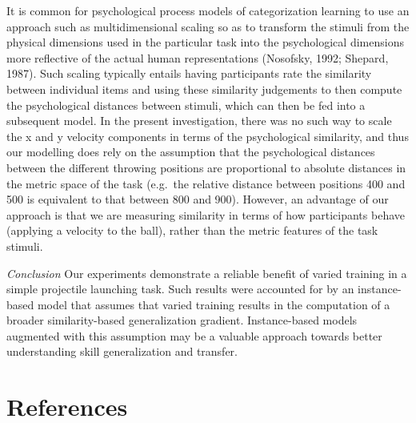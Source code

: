 \documentclass[
  man,floatsintext]{apa7}
\begin{document}
It is common for psychological process models of categorization learning to use an approach such as multidimensional scaling so as to transform the stimuli from the physical dimensions used in the particular task into the psychological dimensions more reflective of the actual human representations (Nosofsky, 1992; Shepard, 1987). Such scaling typically entails having participants rate the similarity between individual items and using these similarity judgements to then compute the psychological distances between stimuli, which can then be fed into a subsequent model. In the present investigation, there was no such way to scale the x and y velocity components in terms of the psychological similarity, and thus our modelling does rely on the assumption that the psychological distances between the different throwing positions are proportional to absolute distances in the metric space of the task (e.g.~the relative distance between positions 400 and 500 is equivalent to that between 800 and 900). However, an advantage of our approach is that we are measuring similarity in terms of how participants behave (applying a velocity to the ball), rather than the metric features of the task stimuli.

\emph{Conclusion}
Our experiments demonstrate a reliable benefit of varied training in a simple projectile launching task. Such results were accounted for by an instance-based model that assumes that varied training results in the computation of a broader similarity-based generalization gradient. Instance-based models augmented with this assumption may be a valuable approach towards better understanding skill generalization and transfer.

\hypertarget{references}{%
\section{References}\label{references}}
\end{document}
